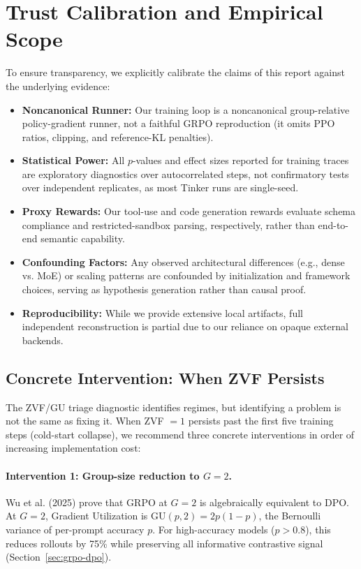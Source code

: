 \section*{Trust Calibration and Empirical Scope}
To ensure transparency, we explicitly calibrate the claims of this report against the underlying evidence:
\begin{itemize}
    \item \textbf{Noncanonical Runner:} Our training loop is a noncanonical group-relative policy-gradient runner, not a faithful GRPO reproduction (it omits PPO ratios, clipping, and reference-KL penalties).
    \item \textbf{Statistical Power:} All $p$-values and effect sizes reported for training traces are exploratory diagnostics over autocorrelated steps, not confirmatory tests over independent replicates, as most Tinker runs are single-seed.
    \item \textbf{Proxy Rewards:} Our tool-use and code generation rewards evaluate schema compliance and restricted-sandbox parsing, respectively, rather than end-to-end semantic capability.
    \item \textbf{Confounding Factors:} Any observed architectural differences (e.g., dense vs. MoE) or scaling patterns are confounded by initialization and framework choices, serving as hypothesis generation rather than causal proof.
    \item \textbf{Reproducibility:} While we provide extensive local artifacts, full independent reconstruction is partial due to our reliance on opaque external backends.
\end{itemize}

\subsection{Concrete Intervention: When ZVF Persists}
\label{sec:zvf_intervention}

The ZVF/GU triage diagnostic identifies regimes, but identifying a problem is
not the same as fixing it.  When ZVF $= 1$ persists past the first five
training steps (cold-start collapse), we recommend three concrete interventions
in order of increasing implementation cost:

\paragraph{Intervention 1: Group-size reduction to $G=2$.}
Wu et al. (2025) prove that GRPO at $G=2$ is algebraically equivalent to DPO.
At $G=2$, Gradient Utilization is GU$(p,2) = 2p(1-p)$, the Bernoulli variance of
per-prompt accuracy $p$.  For high-accuracy models ($p > 0.8$), this reduces
rollouts by 75\% while preserving all informative contrastive signal
(Section~\ref{sec:grpo-dpo}).

